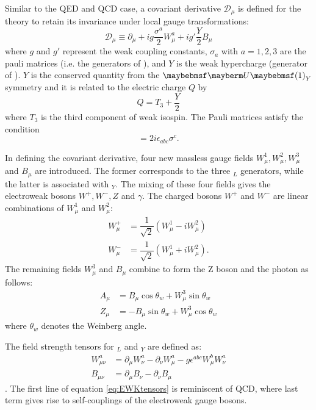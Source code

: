 Similar to the QED and QCD case, a covariant derivative $\mathcal{D}_{\mu}$ is defined for the theory to retain its invariance under local gauge transformations:
\begin{equation}
    \mathcal{D}_{\mu}\equiv \partial_{\mu}+ig\dfrac{\sigma^a}{2}W^a_{\mu}+ig'\dfrac{Y}{2}B_{\mu}
\end{equation}
where $g$ and $g'$ represent the weak coupling constants, $\sigma_a$ with $a=1,2,3$ are the pauli matrices (i.e. the generators of ), and $Y$ is the weak hypercharge (generator of ). $Y$ is the conserved quantity from the $\Ugroup{1}_Y$ symmetry and it is related to the electric charge $Q$ by
\begin{equation}
    Q=T_3+\dfrac{Y}{2}
\end{equation}
where $T_3$ is the third component of weak isospin.
The Pauli matrices satisfy the condition
\begin{equation}
    [\sigma_a,\sigma_b]=2i\epsilon_{abc}\sigma^c.
\end{equation}

In defining the covariant derivative, four new massless gauge fields $W^1_{\mu}, W^2_{\mu}, W^3_{\mu}$ and $B_{\mu}$ are introduced. The former corresponds to the three $_L$ generators, while the latter is associated with $_Y$. The mixing of these four fields gives the electroweak bosons $W^+,W^-,Z$ and $\gamma$. The charged bosons $W^+$ and $W^-$ are linear combinations of $W^1_{\mu}$ and $W^2_{\mu}$:
\begin{align}
    W^+_{\mu} & =\dfrac{1}{\sqrt{2}}(W_{\mu}^1-iW_{\mu}^2)\\
    W^-_{\mu} & =\dfrac{1}{\sqrt{2}}(W_{\mu}^1+iW_{\mu}^2).
\end{align}
The remaining fields $W_{\mu}^3$ and $B_{\mu}$ combine to form the Z boson and the photon as follows:
\begin{align}
    A_{\mu} & =B_{\mu}\cos\theta_{w}+W^3_{\mu}\sin\theta_w\\
    Z_{\mu} & =-B_{\mu}\sin\theta_{w}+W^3_{\mu}\cos\theta_w
\end{align}
where $\theta_w$ denotes the Weinberg angle.

The field strength tensors for $_L$ and $_Y$ are defined as: 
\begin{align} \label{eq:EWKtensors}
    W^a_{\mu\nu} & =\partial_{\mu}W^a_{\nu}-\partial_{\nu}W^a_{\mu}-g\epsilon^{abc}W^b_{\mu}W^a_{\nu}\\
    B_{\mu\nu} & =\partial_{\mu}B_{\nu}-\partial_{\nu}B_{\mu}
\end{align}.
The first line of equation \ref{eq:EWKtensors} is reminiscent of QCD, where last term gives rise to self-couplings of the electroweak gauge bosons. 

